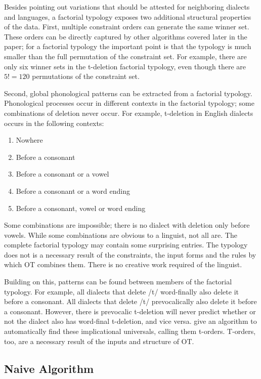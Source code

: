 \documentclass[11pt]{article}
\begin{document}
Besides pointing out variations that should be attested for
neighboring dialects and languages, a factorial typology exposes two
additional structural properties of the data. First, multiple
constraint orders can generate the same winner set. These orders can
be directly captured by other algorithms covered later in the paper;
for a factorial typology the important point is that the typology is
much smaller than the full permutation of the constraint set. For
example, there are only six winner sets in the t-deletion factorial
typology, even though there are $5!=120$ permutations of the
constraint set.

Second, global phonological patterns can be extracted from a factorial
typology. Phonological processes occur in
different contexts in the factorial typology; some combinations of
deletion never occur. For example, t-deletion in English dialects
occurs in the following contexts:

\begin{enumerate}
\item Nowhere
\item Before a consonant
\item Before a consonant or a vowel
\item Before a consonant or a word ending
\item Before a consonant, vowel or word ending
\end{enumerate}

Some combinations are impossible; there is no dialect with
deletion only before vowels. While some combinations are obvious to a
linguist, not all are. The complete factorial typology may contain some surprising
entries. The typology does not is a necessary result of the constraints, the input
forms and the rules by which OT combines them. There is no creative
work required of the linguist.

Building on this, patterns can be found between members of the
factorial typology. For example, all dialects that delete /t/
word-finally also delete it before a consonant. All dialects that
delete /t/ prevocalically also delete it before a consonant. However,
there is prevocalic t-deletion will never predict whether or not the
dialect also has word-final t-deletion, and vice
versa.  give an algorithm to automatically find
these implicational universals, calling them t-orders. T-orders, too,
are a necessary result of the inputs and structure of OT.

\subsection{Naive Algorithm}
\end{document}
